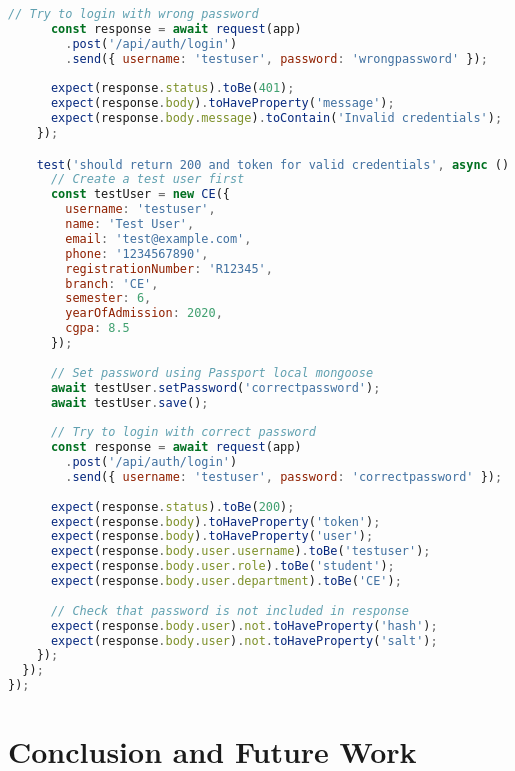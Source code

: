 \documentclass[12pt,a4paper]{report}
\begin{document}
\begin{lstlisting}[language=JavaScript, caption=Authentication Controller Test]
      // Try to login with wrong password
      const response = await request(app)
        .post('/api/auth/login')
        .send({ username: 'testuser', password: 'wrongpassword' });
      
      expect(response.status).toBe(401);
      expect(response.body).toHaveProperty('message');
      expect(response.body.message).toContain('Invalid credentials');
    });

    test('should return 200 and token for valid credentials', async () => {
      // Create a test user first
      const testUser = new CE({
        username: 'testuser',
        name: 'Test User',
        email: 'test@example.com',
        phone: '1234567890',
        registrationNumber: 'R12345',
        branch: 'CE',
        semester: 6,
        yearOfAdmission: 2020,
        cgpa: 8.5
      });
      
      // Set password using Passport local mongoose
      await testUser.setPassword('correctpassword');
      await testUser.save();
      
      // Try to login with correct password
      const response = await request(app)
        .post('/api/auth/login')
        .send({ username: 'testuser', password: 'correctpassword' });
      
      expect(response.status).toBe(200);
      expect(response.body).toHaveProperty('token');
      expect(response.body).toHaveProperty('user');
      expect(response.body.user.username).toBe('testuser');
      expect(response.body.user.role).toBe('student');
      expect(response.body.user.department).toBe('CE');
      
      // Check that password is not included in response
      expect(response.body.user).not.toHaveProperty('hash');
      expect(response.body.user).not.toHaveProperty('salt');
    });
  });
});
\end{lstlisting}

\chapter{Conclusion and Future Work}
\end{document}
